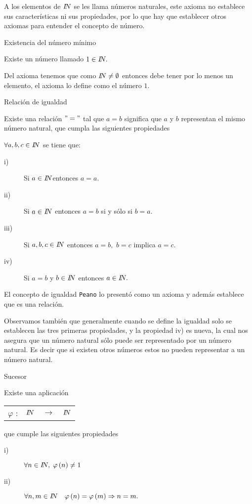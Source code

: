 A los elementos de $\na$ se les llama números naturales, este axioma
no establece sus características ni sus propiedades, por lo que hay
que establecer otros axiomas para entender el concepto de número.

\vspace*{20pt}

\begin{axioma}{Existencia del número mínimo\label{ap4}}

Existe un número llamado $1\in\na.$

\end{axioma}

Del axioma  tenemos que como $\na\neq\emptyset$ entonces
debe tener por lo menos un elemento, el axioma  lo define
como el número $1.$

\medskip{}
\medskip{}

\begin{axioma}{Relación de igualdad\label{ap3}}

Existe una relación $"="$ tal que $a=b$ significa que $a$ y $b$
representan el mismo número natural, que cumpla las siguientes propiedades

$\forall a,b,c\in\na$ se tiene que:
\begin{description}
\item [{i)}] Si $a\in\na$entonces $a=a.$
\item [{ii)}] Si $a\in\na$ entonces $a=b$ si y sólo si $b=a.$
\item [{iii)}] Si $a,b,c\in\na$ entonces $a=b,$ $b=c$ implica $a=c.$
\item [{iv)}] Si $a=b$ y $b\in\na$ entonces $a\in\na.$
\end{description}
\end{axioma}

El concepto de igualdad \texttt{Peano} lo presentó como un axioma
y además establece que es una relación.

Observamos también que generalmente cuando se define la igualdad solo
se establecen las tres primeras propiedades, y la propiedad iv) es
nueva, la cual nos asegura que un número natural sólo puede ser representado
por un número natural. Es decir que si existen otros números estos
no pueden representar a un número natural.\medskip{}
\medskip{}

\begin{axioma}{Sucesor\label{ap2}}

Existe una aplicación %
\begin{tabular}{cccc}
$\varphi$ : &
$\na$ &
$\rightarrow$ &
$\na$\tabularnewline
\end{tabular} que cumple las siguientes propiedades
\begin{description}
\item [{i)}] $\forall n\in\na,\;\varphi\left(n\right)\neq1$
\item [{ii)}] $\forall n,m\in\na\quad\varphi\left(n\right)=\varphi\left(m\right)\Rightarrow n=m.$
\end{description}
\end{axioma}

